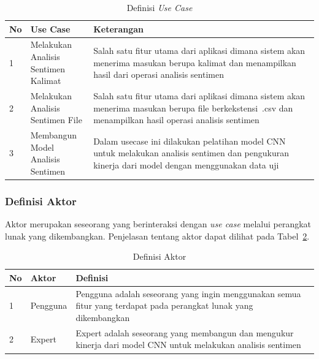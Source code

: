 \begin{table}[H]
  \centering
  \caption{Definisi \emph{Use Case}}
  \label{tab:definisi_usecase}
  \begin{tabularx}{\textwidth}{|l|l|X|}
    \hline
    No & Use Case                        & Keterangan \\ \hline
    1  & \makecell[l]{Melakukan Analisis              \\Sentimen Kalimat} & Salah satu fitur utama dari aplikasi dimana sistem akan menerima masukan berupa kalimat dan menampilkan hasil dari operasi analisis sentimen           \\ \hline
    2  & \makecell[l]{Melakukan Analisis              \\Sentimen File}    & Salah satu fitur utama dari aplikasi dimana sistem akan menerima masukan berupa file berkekstensi~.csv dan menampilkan hasil operasi analisis sentimen \\ \hline
    3  & \makecell[l]{Membangun Model                 \\Analisis Sentimen}    & Dalam usecase ini dilakukan pelatihan model CNN untuk melakukan analisis sentimen dan pengukuran kinerja dari model dengan menggunakan data uji\\ \hline
  \end{tabularx}
\end{table}

\subsubsection{Definisi Aktor}
Aktor merupakan seseorang yang berinteraksi dengan \emph{use case} melalui perangkat lunak yang dikembangkan.
Penjelasan tentang aktor dapat dilihat pada Tabel~\ref{tab:aktor_definisi}.

\begin{table}[H]
  \centering
  \caption{Definisi Aktor}
  \label{tab:aktor_definisi}
  \begin{tabularx}{\columnwidth}{|l|l|X|}
    \hline
    No & Aktor    & Definisi                                                                                                          \\ \hline
    1  & Pengguna & Pengguna adalah seseorang yang ingin menggunakan semua fitur yang terdapat pada perangkat lunak yang dikembangkan \\ \hline
    2  & Expert   & Expert adalah seseorang yang membangun dan mengukur kinerja dari model CNN untuk melakukan analisis sentimen      \\ \hline
  \end{tabularx}
\end{table}

